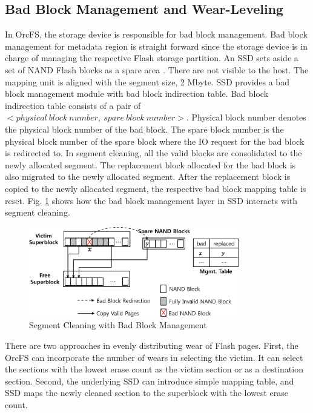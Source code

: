 \documentclass[prodmode,acmtecs]{acmsmall}
\begin{document}
\subsection{Bad Block Management and Wear-Leveling}
\label{subsec:bad_block_management}

In OrcFS, the storage device is responsible for bad block
management. Bad block management for metadata region is straight
forward since the storage device is in charge of managing the
respective Flash storage partition.  An SSD sets aside a set of NAND
Flash blocks as a spare area \cite{chow2007managing}. There are not
visible to the host.  The mapping unit is aligned with the segment
size, 2 Mbyte.  SSD provides a bad block management module with bad
block indirection table. Bad block indirection table consists of a
pair of $<physical~ block~ number, ~spare~ block~ number>$. Physical
block number denotes the physical block number of the bad block. The
spare block number is the physical block number of the spare block
where the IO request for the bad block is redirected to. In segment
cleaning, all the valid blocks are consolidated to the newly allocated
segment. The replacement block allocated for the bad block is also
migrated to the newly allocated segment. After the replacement block
is copied to the newly allocated segment, the respective bad block
mapping table is reset.  Fig. \ref{fig:bad_block} shows how the bad
block management layer in SSD interacts with segment cleaning.


\begin{figure}[t]
\begin{center}
\includegraphics[width=3.6in]{./figure/bad_block_management}
\caption{Segment Cleaning with Bad Block Management}
\label{fig:bad_block}
\end{center}
\end{figure}

There are two approaches in evenly distributing wear of Flash
pages. First, the OrcFS can incorporate the number of wears in
selecting the victim. It can select the sections with the lowest erase
count as the victim section or as a destination section. Second,
the underlying SSD can introduce simple mapping table, and SSD maps the
newly cleaned section to the superblock with the lowest erase count.
\end{document}
